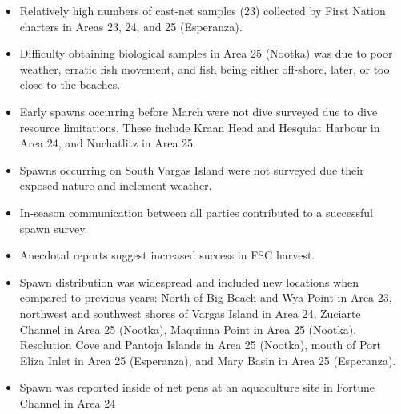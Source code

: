 \begin{itemize}

\item Relatively high numbers of cast-net samples (23)
collected by First Nation charters in Areas 23, 24, and 25 (Esperanza).

\item Difficulty obtaining biological samples in Area 25 (Nootka)
was due to poor weather, erratic fish movement, and
fish being either off-shore, later, or too close to the beaches.

\item Early spawns occurring before March  were not dive surveyed
due to dive resource limitations.
These include Kraan Head and Hesquiat Harbour in Area 24,
and Nuchatlitz in Area 25.

\item Spawns occurring on South Vargas Island were not surveyed
due their exposed nature and inclement weather.

\item In-season communication between all parties
contributed to a successful spawn survey.

\item Anecdotal reports suggest increased success in FSC harvest.

\item Spawn distribution was widespread and
included new locations when compared to previous years:
North of Big Beach and Wya Point in Area 23,
northwest and southwest shores of Vargas Island in Area 24,
Zuciarte Channel in Area 25 (Nootka),
Maquinna Point in Area 25 (Nootka),
Resolution Cove and Pantoja Islands in Area 25 (Nootka),
mouth of Port Eliza Inlet in Area 25 (Esperanza), and
Mary Basin in Area 25 (Esperanza).

\item Spawn was reported inside of net pens at an
aquaculture site in Fortune Channel in Area 24

\end{itemize}
